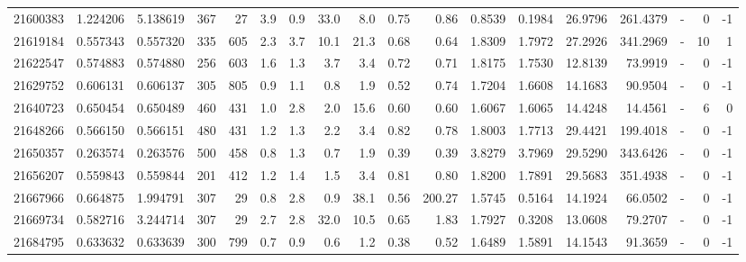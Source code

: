 \begin{tabular}{rrrrrrrrrrrrrrrlrr}
  21600383 & 1.224206 &   5.138619 &  367 &   27 &      3.9 &      0.9 &    33.0 &      8.0 &       0.75 &        0.86 &  0.8539 &  0.1984 &   26.9796 &  261.4379 &             - &        0 &         -1 \\
  21619184 & 0.557343 &   0.557320 &  335 &  605 &      2.3 &      3.7 &    10.1 &     21.3 &       0.68 &        0.64 &  1.8309 &  1.7972 &   27.2926 &  341.2969 &             - &       10 &          1 \\
  21622547 & 0.574883 &   0.574880 &  256 &  603 &      1.6 &      1.3 &     3.7 &      3.4 &       0.72 &        0.71 &  1.8175 &  1.7530 &   12.8139 &   73.9919 &             - &        0 &         -1 \\
  21629752 & 0.606131 &   0.606137 &  305 &  805 &      0.9 &      1.1 &     0.8 &      1.9 &       0.52 &        0.74 &  1.7204 &  1.6608 &   14.1683 &   90.9504 &             - &        0 &         -1 \\
  21640723 & 0.650454 &   0.650489 &  460 &  431 &      1.0 &      2.8 &     2.0 &     15.6 &       0.60 &        0.60 &  1.6067 &  1.6065 &   14.4248 &   14.4561 &             - &        6 &          0 \\
  21648266 & 0.566150 &   0.566151 &  480 &  431 &      1.2 &      1.3 &     2.2 &      3.4 &       0.82 &        0.78 &  1.8003 &  1.7713 &   29.4421 &  199.4018 &             - &        0 &         -1 \\
  21650357 & 0.263574 &   0.263576 &  500 &  458 &      0.8 &      1.3 &     0.7 &      1.9 &       0.39 &        0.39 &  3.8279 &  3.7969 &   29.5290 &  343.6426 &             - &        0 &         -1 \\
  21656207 & 0.559843 &   0.559844 &  201 &  412 &      1.2 &      1.4 &     1.5 &      3.4 &       0.81 &        0.80 &  1.8200 &  1.7891 &   29.5683 &  351.4938 &             - &        0 &         -1 \\
  21667966 & 0.664875 &   1.994791 &  307 &   29 &      0.8 &      2.8 &     0.9 &     38.1 &       0.56 &      200.27 &  1.5745 &  0.5164 &   14.1924 &   66.0502 &             - &        0 &         -1 \\
  21669734 & 0.582716 &   3.244714 &  307 &   29 &      2.7 &      2.8 &    32.0 &     10.5 &       0.65 &        1.83 &  1.7927 &  0.3208 &   13.0608 &   79.2707 &             - &        0 &         -1 \\
  21684795 & 0.633632 &   0.633639 &  300 &  799 &      0.7 &      0.9 &     0.6 &      1.2 &       0.38 &        0.52 &  1.6489 &  1.5891 &   14.1543 &   91.3659 &             - &        0 &         -1 \\

\end{tabular}
